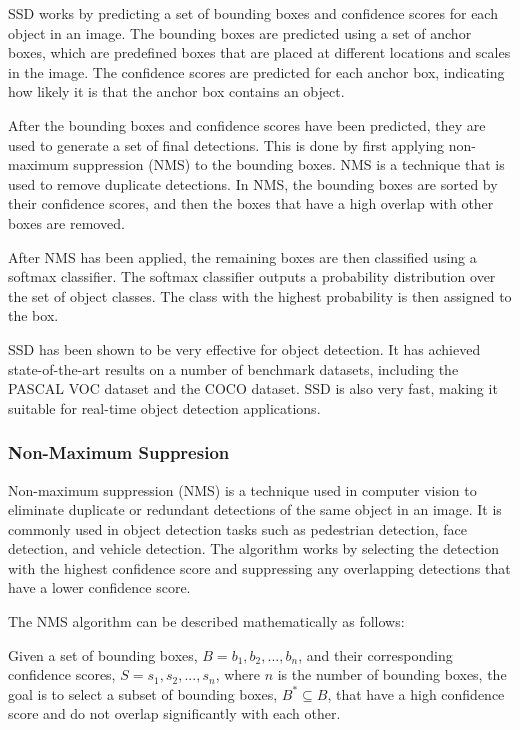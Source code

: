 \documentclass[final,rdr32.tex]{subfiles}
\begin{document}
SSD works by predicting a set of bounding boxes and confidence scores for each object in an image. The bounding boxes are predicted using a set of anchor boxes, which are predefined boxes that are placed at different locations and scales in the image. The confidence scores are predicted for each anchor box, indicating how likely it is that the anchor box contains an object.

After the bounding boxes and confidence scores have been predicted, they are used to generate a set of final detections. This is done by first applying non-maximum suppression (NMS) to the bounding boxes. NMS is a technique that is used to remove duplicate detections. In NMS, the bounding boxes are sorted by their confidence scores, and then the boxes that have a high overlap with other boxes are removed.

After NMS has been applied, the remaining boxes are then classified using a softmax classifier. The softmax classifier outputs a probability distribution over the set of object classes. The class with the highest probability is then assigned to the box.

SSD has been shown to be very effective for object detection. It has achieved state-of-the-art results on a number of benchmark datasets, including the PASCAL VOC dataset and the COCO dataset. SSD is also very fast, making it suitable for real-time object detection applications.

\subsubsection{Non-Maximum Suppresion}

Non-maximum suppression (NMS) is a technique used in computer vision to eliminate duplicate or redundant detections of the same object in an image. It is commonly used in object detection tasks such as pedestrian detection, face detection, and vehicle detection. The algorithm works by selecting the detection with the highest confidence score and suppressing any overlapping detections that have a lower confidence score.

The NMS algorithm can be described mathematically as follows:

Given a set of bounding boxes, $B = {b_1, b_2, ..., b_n}$, and their corresponding confidence scores, $S = {s_1, s_2, ..., s_n}$, where $n$ is the number of bounding boxes, the goal is to select a subset of bounding boxes, $B^* \subseteq B$, that have a high confidence score and do not overlap significantly with each other.
\end{document}
